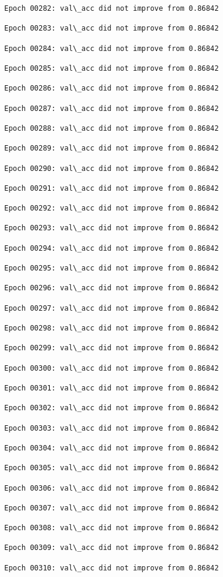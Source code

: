 \documentclass[11pt]{article}
\begin{document}
\begin{Verbatim}[commandchars=\\\{\}]
Epoch 00282: val\_acc did not improve from 0.86842

Epoch 00283: val\_acc did not improve from 0.86842

Epoch 00284: val\_acc did not improve from 0.86842

Epoch 00285: val\_acc did not improve from 0.86842

Epoch 00286: val\_acc did not improve from 0.86842

Epoch 00287: val\_acc did not improve from 0.86842

Epoch 00288: val\_acc did not improve from 0.86842

Epoch 00289: val\_acc did not improve from 0.86842

Epoch 00290: val\_acc did not improve from 0.86842

Epoch 00291: val\_acc did not improve from 0.86842

Epoch 00292: val\_acc did not improve from 0.86842

Epoch 00293: val\_acc did not improve from 0.86842

Epoch 00294: val\_acc did not improve from 0.86842

Epoch 00295: val\_acc did not improve from 0.86842

Epoch 00296: val\_acc did not improve from 0.86842

Epoch 00297: val\_acc did not improve from 0.86842

Epoch 00298: val\_acc did not improve from 0.86842

Epoch 00299: val\_acc did not improve from 0.86842

Epoch 00300: val\_acc did not improve from 0.86842

Epoch 00301: val\_acc did not improve from 0.86842

Epoch 00302: val\_acc did not improve from 0.86842

Epoch 00303: val\_acc did not improve from 0.86842

Epoch 00304: val\_acc did not improve from 0.86842

Epoch 00305: val\_acc did not improve from 0.86842

Epoch 00306: val\_acc did not improve from 0.86842

Epoch 00307: val\_acc did not improve from 0.86842

Epoch 00308: val\_acc did not improve from 0.86842

Epoch 00309: val\_acc did not improve from 0.86842

Epoch 00310: val\_acc did not improve from 0.86842


\end{Verbatim}
\end{document}
